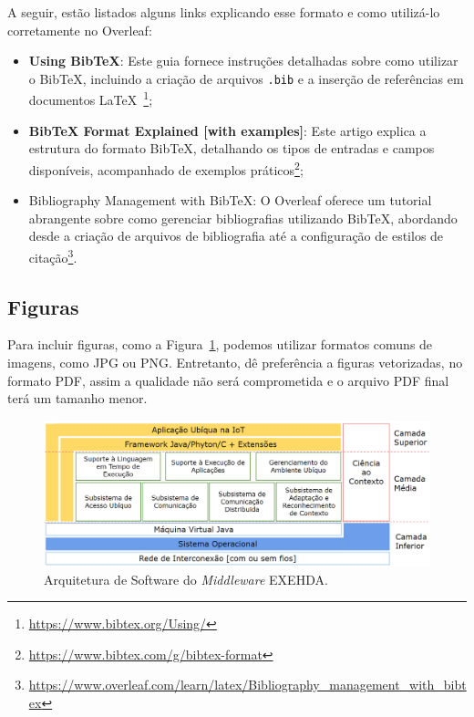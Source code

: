     A seguir, estão listados alguns links explicando esse formato e como utilizá-lo corretamente no Overleaf:
    \begin{itemize}
        \item 
        \textbf{Using BibTeX}: Este guia fornece instruções detalhadas sobre como utilizar o BibTeX, incluindo a criação de arquivos \texttt{.bib} e a inserção de referências em documentos LaTeX~\footnote{\url{https://www.bibtex.org/Using/}}; 
        \item 
        \textbf{BibTeX Format Explained [with examples]}: Este artigo explica a estrutura do formato BibTeX, detalhando os tipos de entradas e campos disponíveis, acompanhado de exemplos práticos\footnote{\url{https://www.bibtex.com/g/bibtex-format}}; 
        \item 
        Bibliography Management with BibTeX: O Overleaf oferece um tutorial abrangente sobre como gerenciar bibliografias utilizando BibTeX, abordando desde a criação de arquivos de bibliografia até a configuração de estilos de citação\footnote{\url{https://www.overleaf.com/learn/latex/Bibliography_management_with_bibtex}}.
    \end{itemize}

\subsection{Figuras}

Para incluir figuras, como a Figura~\ref{fig:exemplo-figura}, podemos utilizar formatos comuns de imagens, como JPG ou PNG. Entretanto, dê preferência a figuras vetorizadas, no formato PDF, assim a qualidade não será comprometida e o arquivo PDF final terá um tamanho menor. 

\begin{figure}[!htbp]
    \centering
    \caption{\label{fig:exemplo-figura} Arquitetura de Software do \textit{Middleware} EXEHDA.}
    \includegraphics[width=\textwidth]{img/ArquiteturaExehda_v4-pt_BR.png}
    
\end{figure}

